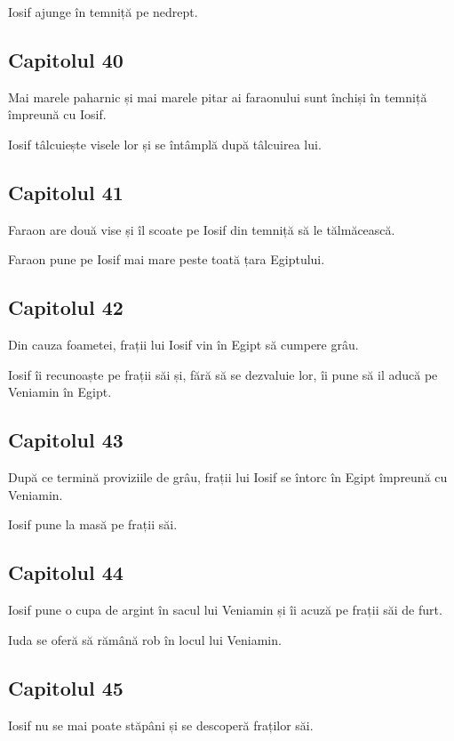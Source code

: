 \documentclass[12pt,a4paper]{article}
\begin{document}
Iosif ajunge în temniță pe nedrept.

\subsection{Capitolul 40}

Mai marele paharnic și mai marele pitar ai faraonului sunt închiși în temniță împreună cu Iosif.

Iosif tâlcuiește visele lor și se întâmplă după tâlcuirea lui.

\subsection{Capitolul 41}

Faraon are două vise și îl scoate pe Iosif din temniță să le tălmăcească.

Faraon pune pe Iosif mai mare peste toată țara Egiptului.

\subsection{Capitolul 42}

Din cauza foametei, frații lui Iosif vin în Egipt să cumpere grâu.

Iosif îi recunoaște pe frații săi și, fără să se dezvaluie lor,
îi pune să il aducă pe Veniamin în Egipt.

\subsection{Capitolul 43}

După ce termină proviziile de grâu, frații lui Iosif se întorc în Egipt împreună cu Veniamin.

Iosif pune la masă pe frații săi.

\subsection{Capitolul 44}

Iosif pune o cupa de argint în sacul lui Veniamin și îi acuză pe frații săi de furt.

Iuda se oferă să rămână rob în locul lui Veniamin.

\subsection{Capitolul 45}

Iosif nu se mai poate stăpâni și se descoperă fraților săi.
\end{document}
